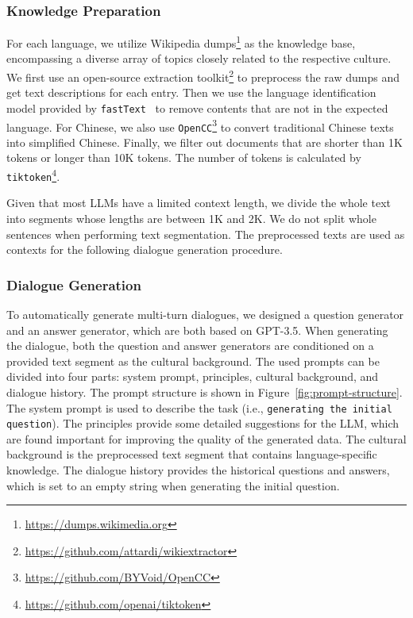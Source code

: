 \documentclass[11pt]{article}
\begin{document}
\subsubsection{Knowledge Preparation}
For each language, we utilize Wikipedia dumps\footnote{\url{https://dumps.wikimedia.org}} as the knowledge base, encompassing a diverse array of topics closely related to the respective culture. We first use an open-source extraction toolkit\footnote{\url{https://github.com/attardi/wikiextractor}} to preprocess the raw dumps and get text descriptions for each entry. Then we use the language identification model provided by \texttt{fastText}~\cite{fasttext} to remove contents that are not in the expected language. For Chinese, we also use \texttt{OpenCC}\footnote{\url{https://github.com/BYVoid/OpenCC}} to convert traditional Chinese texts into simplified Chinese. Finally, we filter out documents that are shorter than 1K tokens or longer than 10K tokens. The number of tokens is calculated by \texttt{tiktoken}\footnote{\url{https://github.com/openai/tiktoken}}.

Given that most LLMs have a limited context length, we divide the whole text into segments whose lengths are between 1K and 2K. We do not split whole sentences when performing text segmentation.
The preprocessed texts are used as contexts for the following dialogue generation procedure.

\subsubsection{Dialogue Generation}

To automatically generate multi-turn dialogues, we designed a question generator and an answer generator, which are both based on GPT-3.5. 
When generating the dialogue, both the question and answer generators are conditioned on a provided text segment as the cultural background.
The used prompts can be divided into four parts: system prompt, principles, cultural background, and dialogue history. The prompt structure is shown in Figure~\ref{fig:prompt-structure}.
The system prompt is used to describe the task (i.e., \texttt{generating the initial question}). The principles provide some detailed suggestions for the LLM, which are found important for improving the quality of the generated data. The cultural background is the preprocessed text segment that contains language-specific knowledge. The dialogue history provides the historical questions and answers, which is set to an empty string when generating the initial question.
\end{document}
